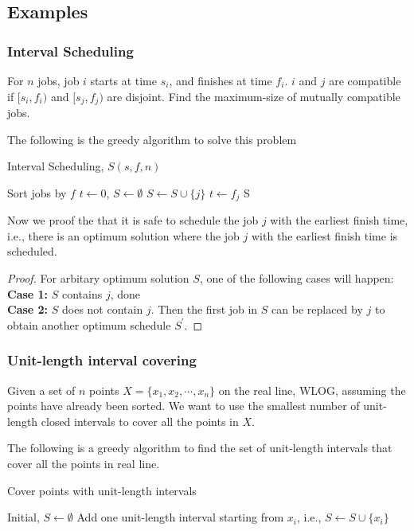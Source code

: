 				\subsection{Examples}
					\subsubsection{Interval Scheduling}
						For $n$ jobs, job $i$ starts at time $s_i$, and finishes at time $f_i$. $i$ and $j$ are compatible if $[s_i, f_i)$ and $[s_j, f_j)$ are disjoint. Find the maximum-size of mutually compatible jobs.

						The following is the greedy algorithm to solve this problem
						\begin{algorithm}[!ht]
							\caption{Interval Scheduling, $S(s, f, n)$}
							\begin{algorithmic}[1]
								\State Sort jobs by $f$
								\State $t \gets 0$, $S\gets \emptyset$
										\State $S \gets S \cup \{j\}$
										\State $t \gets f_j$
									\EndIf
								\EndFor
								\Return S
							\end{algorithmic}
						\end{algorithm}

						Now we proof the that it is safe to schedule the job $j$ with the earliest finish time, i.e., there is an optimum solution where the job $j$ with the earliest finish time is scheduled.

						\begin{proof}
							For arbitary optimum solution $S$, one of the following cases will happen:\\
							\textbf{Case 1: } $S$ contains $j$, done\\
							\textbf{Case 2: } $S$ does not contain $j$. Then the first job in $S$ can be replaced by $j$ to obtain another optimum schedule $S^\prime$.
						\end{proof}

					\subsubsection{Unit-length interval covering}
						Given a set of $n$ points $X = \{x_1, x_2, \cdots, x_n\}$ on the real line, WLOG, assuming the points have already been sorted. We want to use the smallest number of unit-length closed intervals to cover all the points in $X$. 

						The following is a greedy algorithm to find the set of unit-length intervals that cover all the points in real line.
						\begin{algorithm}[!ht]
							\caption{Cover points with unit-length intervals}
							\begin{algorithmic}[1]
								\State Initial, $S \gets \emptyset$
										\State Add one unit-length interval starting from $x_i$, i.e., $S \gets S \cup \{x_i\}$
									\EndIf
								\EndFor
							\end{algorithmic}
						\end{algorithm}

